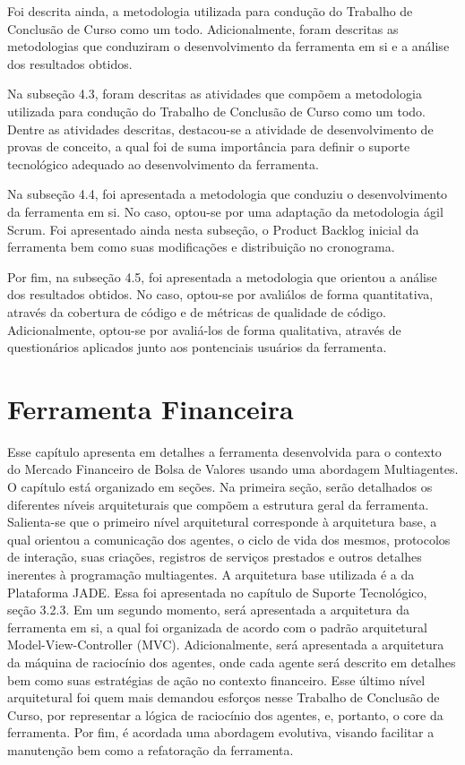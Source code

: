 Foi descrita ainda, a metodologia utilizada para condução do Trabalho de Conclusão de Curso como um todo. Adicionalmente, foram descritas as metodologias que conduziram o desenvolvimento da ferramenta em si e a análise dos resultados obtidos.

Na subseção 4.3, foram descritas as atividades que compõem a metodologia utilizada para condução do Trabalho de Conclusão de Curso como um todo. Dentre as atividades descritas, destacou-se a atividade de desenvolvimento de provas de conceito, a qual foi de suma importância para definir o suporte tecnológico adequado ao desenvolvimento da ferramenta.   

Na subseção 4.4, foi apresentada a metodologia que conduziu o desenvolvimento da ferramenta em si. No caso, optou-se por uma adaptação da metodologia ágil Scrum. Foi apresentado ainda nesta subseção, o Product Backlog inicial da ferramenta bem como suas modificações e distribuição no cronograma.

Por fim, na subseção 4.5, foi apresentada a metodologia que orientou a análise dos resultados obtidos. No caso, optou-se por avaliálos de forma quantitativa, através da cobertura de código e de métricas de qualidade de código. Adicionalmente, optou-se por avaliá-los de forma qualitativa, através de questionários aplicados junto aos pontenciais usuários da ferramenta.


\newpage
\chapter[FERRAMENTA FINANCEIRA]{Ferramenta Financeira}

Esse capítulo apresenta em detalhes a ferramenta desenvolvida para o contexto do Mercado Financeiro de Bolsa de Valores usando uma abordagem Multiagentes. O capítulo está organizado em seções. Na primeira seção, serão detalhados os diferentes níveis arquiteturais que compõem a estrutura geral da ferramenta. Salienta-se que o primeiro nível arquitetural corresponde à arquitetura base, a qual orientou a comunicação dos agentes, o ciclo de vida dos mesmos, protocolos de interação, suas criações, registros de serviços prestados e outros detalhes inerentes à programação multiagentes. A arquitetura base utilizada é a da Plataforma JADE. Essa foi apresentada no capítulo de Suporte Tecnológico, seção 3.2.3. Em um segundo momento, será apresentada a arquitetura da ferramenta em si, a qual foi organizada de acordo com o padrão arquitetural Model-View-Controller (MVC). Adicionalmente, será apresentada a arquitetura da máquina de raciocínio dos agentes, onde cada agente será descrito em detalhes bem como suas estratégias de ação no contexto financeiro. Esse último nível arquitetural foi quem mais demandou esforços nesse Trabalho de Conclusão de Curso, por representar a lógica de raciocínio dos agentes, e, portanto, o core da ferramenta. Por fim, é acordada uma abordagem evolutiva, visando facilitar a manutenção bem como a refatoração da ferramenta.

